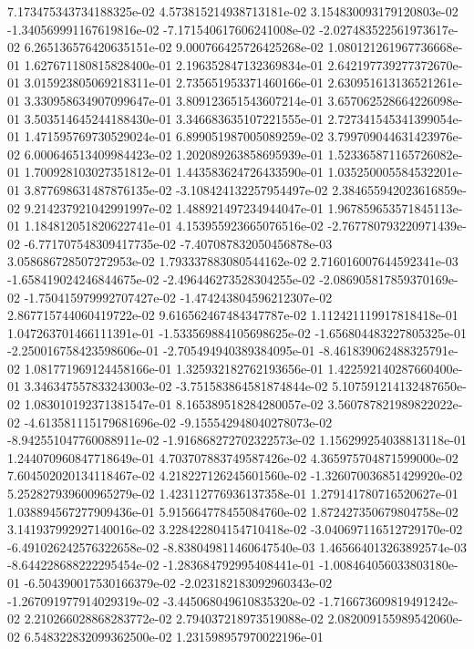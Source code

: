 7.173475343734188325e-02
4.573815214938713181e-02
3.154830093179120803e-02
-1.340569991167619816e-02
-7.171540617606241008e-02
-2.027483522561973617e-02
6.265136576420635151e-02
9.000766425726425268e-02
1.080121261967736668e-01
1.627671180815828400e-01
2.196352847132369834e-01
2.642197739277372670e-01
3.015923805069218311e-01
2.735651953371460166e-01
2.630951613136521261e-01
3.330958634907099647e-01
3.809123651543607214e-01
3.657062528664226098e-01
3.503514645244188430e-01
3.346683635107221555e-01
2.727341545341399054e-01
1.471595769730529024e-01
6.899051987005089259e-02
3.799709044631423976e-02
6.000646513409984423e-02
1.202089263858695939e-01
1.523365871165726082e-01
1.700928103027351812e-01
1.443583624726433590e-01
1.035250005584532201e-01
3.877698631487876135e-02
-3.108424132257954497e-02
2.384655942023616859e-02
9.214237921042991997e-02
1.488921497234944047e-01
1.967859653571845113e-01
1.184812051820622741e-01
4.153955923665076516e-02
-2.767780793220971439e-02
-6.771707548309417735e-02
-7.407087832050456878e-03
3.058686728507272953e-02
1.793337883080544162e-02
2.716016007644592341e-03
-1.658419024246844675e-02
-2.496446273528304255e-02
-2.086905817859370169e-02
-1.750415979992707427e-02
-1.474243804596212307e-02
2.867715744060419722e-02
9.616562467484347787e-02
1.112421119917818418e-01
1.047263701466111391e-01
-1.533569884105698625e-02
-1.656804483227805325e-01
-2.250016758423598606e-01
-2.705494940389384095e-01
-8.461839062488325791e-02
1.081771969124458166e-01
1.325932182762193656e-01
1.422592140287660400e-01
3.346347557833243003e-02
-3.751583864581874844e-02
5.107591214132487650e-02
1.083010192371381547e-01
8.165389518284280057e-02
3.560787821989822022e-02
-4.613581115179681696e-02
-9.155542948040278073e-02
-8.942551047760088911e-02
-1.916868272702322573e-02
1.156299254038813118e-01
1.244070960847718649e-01
4.703707883749587426e-02
4.365975704871599000e-02
7.604502020134118467e-02
4.218227126245601560e-02
-1.326070036851429920e-02
5.252827939600965279e-02
1.423112776936137358e-01
1.279141780716520627e-01
1.038894567277909436e-01
5.915664778455084760e-02
1.872427350679804758e-02
3.141937992927140016e-02
3.228422804154710418e-02
-3.040697116512729170e-02
-6.491026242576322658e-02
-8.838049811460647540e-03
1.465664013263892574e-03
-8.644228688222295454e-02
-1.283684792995408441e-01
-1.008464056033803180e-01
-6.504390017530166379e-02
-2.023182183092960343e-02
-1.267091977914029319e-02
-3.445068049610835320e-02
-1.716673609819491242e-02
2.210266028868283772e-02
2.794037218973519088e-02
2.082009155989542060e-02
6.548322832099362500e-02
1.231598957970022196e-01
